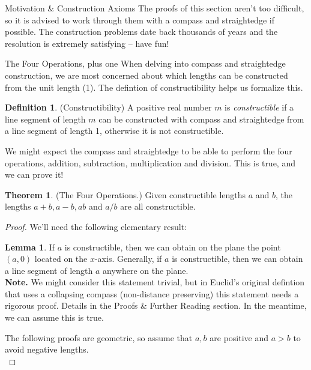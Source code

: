 \documentclass[12pt]{article}
\theoremstyle{definition}
\newtheorem{definition}{Definition}[section]
\theoremstyle{definition}
\theoremstyle{definition}
\newtheorem{theorem}{Theorem}[section]
\theoremstyle{definition}
\newtheorem{lemma}{Lemma}[section]
\theoremstyle{definition}
\theoremstyle{definition}
\theoremstyle{definition}
\begin{document}
\begin{section}{Motivation \& Construction Axioms}
    The proofs of this section aren't too difficult, so it is advised to work through them with a compass and straightedge if possible. The construction problems 
    date back thousands of years and the resolution is extremely satisfying -- have fun!
\end{section}

\newpage

\begin{section}{The Four Operations, plus one}
    When delving into compass and straightedge construction, we are most concerned about which lengths can be constructed from the unit length (1). The defintion 
    of constructibility helps us formalize this.

    \begin{definition}{(Constructibility)}
        A positive real number \(m\) is \textit{constructible} if a line segment of length \(m\) can be constructed with compass and straightedge from a line segment 
        of length 1, otherwise it is not constructible.
    \end{definition}

    We might expect the compass and straightedge to be able to perform the four operations, addition, subtraction, multiplication and division. This is true, and 
    we can prove it!

    \begin{theorem}{(The Four Operations.)}
        Given constructible lengths \(a\) and \(b\), the lengths \(a+b, a-b, ab\) and \(a/b\) are all constructible.
        \begin{proof}
            We'll need the following elementary result:
            \begin{lemma}
                If \(a\) is constructible, then we can obtain on the plane the point \((a,0)\) located on the \(x\)-axis. Generally, if \(a\) is constructible, then we 
                can obtain a line segment of length \(a\) anywhere on the plane. \\
                \noindent\textbf{Note.} We might consider this statement trivial, but in Euclid's original defintion that uses a collapsing compass (non-distance preserving)
                this statement needs a rigorous proof. Details in the Proofs \& Further Reading section. In the meantime, we can assume this is true.
            \end{lemma}

            The following proofs are geometric, so assume that \(a,b\) are positive and \(a>b\) to avoid negative lengths.\\


\end{proof}
\end{theorem}
\end{section}
\end{document}
